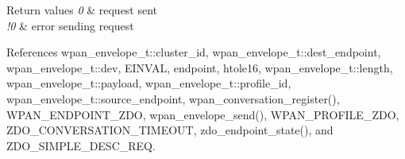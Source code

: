 \begin{DoxyRetVals}{Return values}
{\em 0} & request sent \\
\hline
{\em !0} & error sending request \\
\hline
\end{DoxyRetVals}


References wpan\-\_\-envelope\-\_\-t\-::cluster\-\_\-id, wpan\-\_\-envelope\-\_\-t\-::dest\-\_\-endpoint, wpan\-\_\-envelope\-\_\-t\-::dev, E\-I\-N\-V\-A\-L, endpoint, htole16, wpan\-\_\-envelope\-\_\-t\-::length, wpan\-\_\-envelope\-\_\-t\-::payload, wpan\-\_\-envelope\-\_\-t\-::profile\-\_\-id, wpan\-\_\-envelope\-\_\-t\-::source\-\_\-endpoint, wpan\-\_\-conversation\-\_\-register(), W\-P\-A\-N\-\_\-\-E\-N\-D\-P\-O\-I\-N\-T\-\_\-\-Z\-D\-O, wpan\-\_\-envelope\-\_\-send(), W\-P\-A\-N\-\_\-\-P\-R\-O\-F\-I\-L\-E\-\_\-\-Z\-D\-O, Z\-D\-O\-\_\-\-C\-O\-N\-V\-E\-R\-S\-A\-T\-I\-O\-N\-\_\-\-T\-I\-M\-E\-O\-U\-T, zdo\-\_\-endpoint\-\_\-state(), and Z\-D\-O\-\_\-\-S\-I\-M\-P\-L\-E\-\_\-\-D\-E\-S\-C\-\_\-\-R\-E\-Q.

